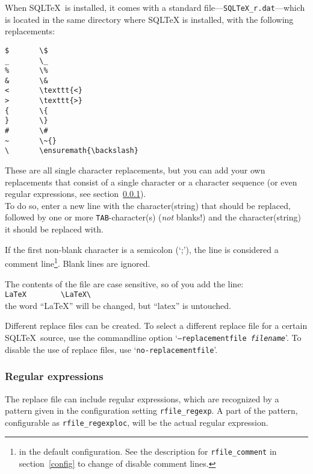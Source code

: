 \documentclass{article}
\begin{document}
When SQL\TeX\ is installed, it comes with a standard file---\texttt{SQLTeX\_r.dat}---which is located in the same directory where SQLTeX is installed,
with the following replacements:

\vspace{3mm}

\noindent\begin{verbatim}
$       \$
_       \_
%       \%
&       \&
<       \texttt{<}
>       \texttt{>}
{       \{
}       \}
#       \#
~       \~{}
\       \ensuremath{\backslash}
\end{verbatim}

\vspace{3mm}

These are all single character replacements, but you can add your own replacements that consist of a single character or a character sequence (or even regular expressions, see section~\ref{regexp}).\\
To do so, enter a new line with the character(string) that should be replaced, followed by one or more \texttt{TAB}-character(s) (\textit{not} blanks!) and the character(string) it should be replaced with.

If the first non-blank character is a semicolon (`;'), the line is considered a comment line\footnote{ in the default configuration. See the description for \texttt{rfile\_comment} in section~\ref{config} to change of disable comment lines.}. Blank lines are ignored.

\vspace{3mm}

The contents of the file are case sensitive, so of you add the line: \\
\verb+LaTeX        \LaTeX\+ \\
the word ``LaTeX'' will be changed, but ``latex'' is untouched.

\vspace{3mm}

Different replace files can be created. To select a different replace file for a certain SQL\TeX\ source, use the commandline option
`\texttt{--replacementfile \textit{filename}}'. To disable the use of replace files, use `\texttt{no-replacementfile}'.

\subsubsection{Regular expressions}\label{regexp}

The replace file can include regular expressions, which are recognized by a pattern given in the configuration setting \texttt{rfile\_regexp}. A part of the pattern, configurable as \texttt{rfile\_regexploc}, will be the actual regular expression.
\end{document}
